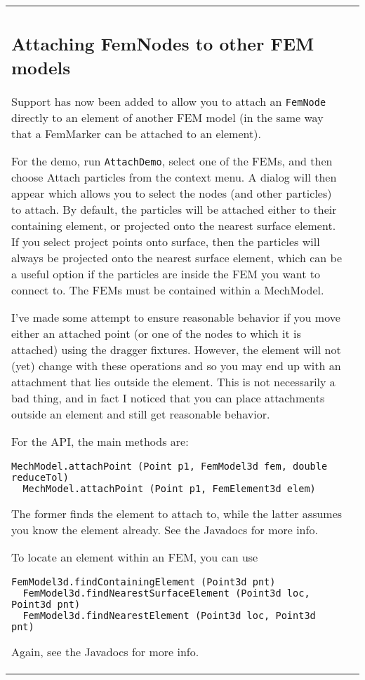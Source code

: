 \documentclass{article}
\begin{document}
\begin{tabular}{ll}
\subsection*{Attaching FemNodes to other FEM models}

Support has now been added to allow you to attach an {\tt FemNode}
directly to an element of another FEM model (in the same way that a
FemMarker can be attached to an element).

For the demo, run {\tt AttachDemo}, select one of the FEMs, and then
choose {\sf Attach particles} from the context menu. A dialog will then
appear which allows you to select the nodes (and other particles) to
attach. By default, the particles will be attached either to their
containing element, or projected onto the nearest surface element.  If
you select {\sf project points onto surface}, then the particles will
always be projected onto the nearest surface element, which can be a
useful option if the particles are inside the FEM you want to connect
to. The FEMs must be contained within a MechModel.

I've made some attempt to ensure reasonable behavior if you move
either an attached point (or one of the nodes to which it is attached)
using the dragger fixtures. However, the element will not (yet) change
with these operations and so you may end up with an attachment that
lies outside the element. This is not necessarily a bad thing, and in
fact I noticed that you can place attachments outside an element and
still get reasonable behavior.

For the API, the main methods are:

\begin{lstlisting}[]
  MechModel.attachPoint (Point p1, FemModel3d fem, double reduceTol)
  MechModel.attachPoint (Point p1, FemElement3d elem)
\end{lstlisting}

The former finds the element to attach to, while the latter assumes you
know the element already. See the Javadocs for more info.

To locate an element within an FEM, you can use

\begin{lstlisting}[]
  FemModel3d.findContainingElement (Point3d pnt)
  FemModel3d.findNearestSurfaceElement (Point3d loc, Point3d pnt)
  FemModel3d.findNearestElement (Point3d loc, Point3d pnt)
\end{lstlisting}

Again, see the Javadocs for more info.


\end{tabular}
\end{document}
